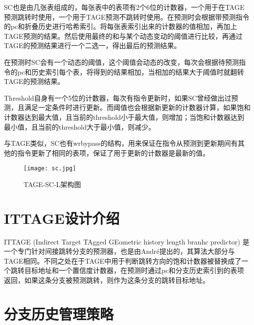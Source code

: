 SC也是由几张表组成的，每张表中的表项有2个6位的计数器，一个用于在TAGE预测跳转时使用，一个用于TAGE预测不跳转时使用。在预测时会根据带预测指令的pc和折叠历史进行哈希索引。将每张表索引出来的计数器的值相加，再加上TAGE预测的结果。然后使用最终的和与某个动态变动的阈值进行比较，再通过TAGE的预测结果进行一个二选一，得出最后的预测结果。

在预测时SC会有一个动态的阈值，这个阈值会动态的改变，每次会根据待预测指令的pc和历史索引每个表，将得到的结果相加，当相加的结果大于阈值时就翻转TAGE的预测结果。

Threshold自身有一个5位的计数器，每次有指令更新时，如果SC曾经做出过预测，且满足一定条件时进行更新。而阈值也会根据新更新的计数器计算，如果饱和计数器达到最大值，且当前的threshold小于最大值，则增加；当饱和计数器达到最小值，且当前的threshold大于最小值，则减少。


与TAGE类似，SC也有wrbypass的结构，用来保证在指令从预测到更新期间有其他的指令更新了相同的表项，保证了用于更新的计数器是最新的值。

\begin{figure}[htb]
	\centering
	\setlength\tabcolsep{3pt}  %
	\vspace{5pt} %
	\texttt{[image: sc.jpg]}
	\caption{TAGE-SC-L架构图\cite{tage-sc-l}}
	\label{fig:figure24}
\end{figure}


\section{ITTAGE设计介绍}

ITTAGE (Indirect Target TAgged GEometric history length branhc predictor)\cite{tage, ittage} 是一个专门针对间接跳转分支的预测器，也是由André提出的，其算法大部分与TAGE相同。不同之处在于TAGE中用于判断跳转方向的饱和计数器被替换成了一个跳转目标地址和一个置信度计数器，在预测时通过pc和分支历史索引到的表项返回，如果这条分支被预测跳转，则作为这条分支的跳转目标地址。

\section{分支历史管理策略}

